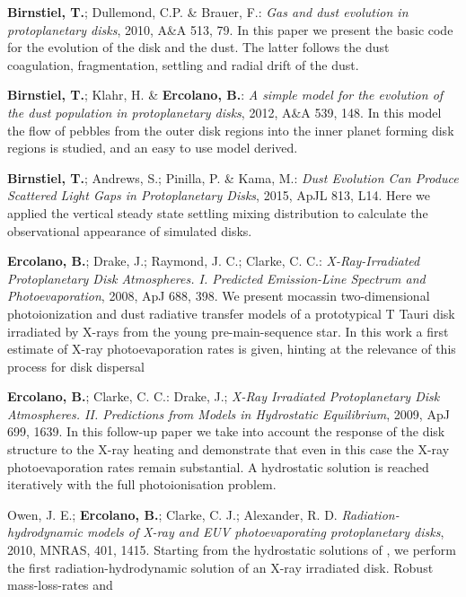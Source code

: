 \documentclass[10pt,fleqn,twoside]{article}
\begin{document}
\begin{literature}
\item {\bf Birnstiel, T.}; Dullemond, C.P. \& Brauer, F.: \textit{Gas and
dust evolution in protoplanetary disks}, 2010, A\&A 513, 79. In this paper we
  present the basic code for the evolution of the disk and the dust. The
  latter follows the dust coagulation, fragmentation, settling and radial
  drift of the dust.
\item{\bf Birnstiel, T.}; Klahr, H. \& {\bf Ercolano, B.}: \textit{A simple model
for the evolution of the dust population in protoplanetary disks}, 
  2012, A\&A 539, 148. In this model the flow of pebbles from the outer
  disk regions into the inner planet forming disk regions is studied,
  and an easy to use model derived.
\item {\bf Birnstiel, T.}; Andrews, S.; Pinilla, P. \& Kama, M.:
\textit{Dust Evolution Can Produce Scattered Light Gaps in Protoplanetary Disks},
2015, ApJL 813, L14. Here we applied the vertical steady state
settling mixing distribution to calculate the observational appearance
of simulated disks.
\item {\bf Ercolano, B.}; Drake, J.; Raymond, J. C.; Clarke, C. C.:
\textit{X-Ray-Irradiated Protoplanetary Disk Atmospheres. I. Predicted Emission-Line Spectrum and Photoevaporation},
2008, ApJ 688, 398. We present mocassin two-dimensional
photoionization and dust radiative transfer models of a prototypical T
Tauri disk irradiated by X-rays from the young pre-main-sequence
star. In this work a first estimate of X-ray photoevaporation rates is
given, hinting at the relevance of this process for disk dispersal
\item {\bf Ercolano, B.}; Clarke, C. C.: Drake, J.;
\textit{X-Ray Irradiated Protoplanetary Disk Atmospheres. II. Predictions from Models in Hydrostatic Equilibrium},
2009, ApJ 699, 1639. In this follow-up paper we take into account the
response of the disk structure to the X-ray heating and demonstrate
that even in this case the X-ray photoevaporation rates remain
substantial. A hydrostatic solution is reached iteratively with the
full photoionisation problem. 
\item Owen, J. E.; {\bf Ercolano, B.}; Clarke, C. J.; Alexander, R. D.
\textit{Radiation-hydrodynamic models of X-ray and EUV photoevaporating protoplanetary disks},
2010, MNRAS, 401, 1415. Starting from the hydrostatic solutions of
\citet{2009ApJ...699.1639E}, we perform the first radiation-hydrodynamic
solution of an X-ray irradiated disk. Robust mass-loss-rates and

\end{literature}
\end{document}

